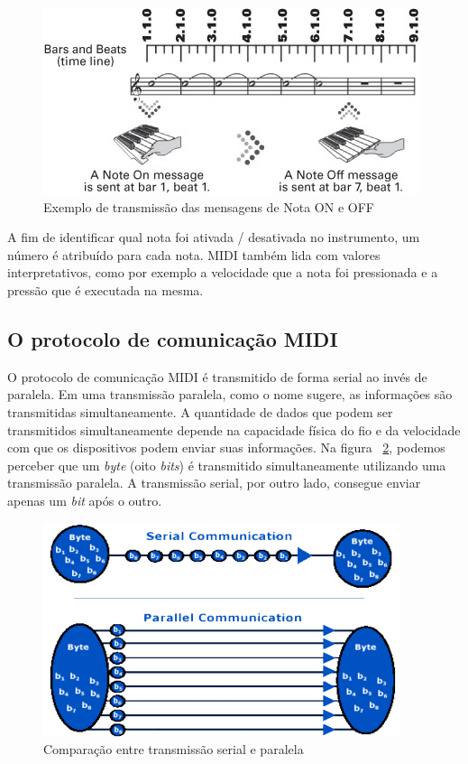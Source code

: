             \begin{figure}[H]
            	\centering
            	\includegraphics{Imagens/MIDI_Nota_ON_e_OFF.jpg}
            	\caption[Exemplo de transmissão das mensagens de Nota ON e OFF]{Exemplo de transmissão das mensagens de Nota ON e OFF ~\cite{Guerin}}
            	\label{fig:MIDI_Nota_ON_e_OFF}
            \end{figure}

            A fim de identificar qual nota foi ativada / desativada no instrumento, um número é atribuído para cada nota. MIDI também lida com valores interpretativos, como por exemplo a velocidade que a nota foi pressionada e a pressão que é executada na mesma.

        \subsection{O protocolo de comunicação MIDI}

            O protocolo de comunicação MIDI é transmitido de forma serial ao invés de paralela. Em uma transmissão paralela, como o nome sugere, as informações são transmitidas simultaneamente. A quantidade de dados que podem ser transmitidos simultaneamente depende na capacidade física do fio e da velocidade com que os dispositivos podem enviar suas informações. Na figura ~\ref{fig:Parallel_versus_serial_transmissions}, podemos perceber que um \textit{byte} (oito \textit{bits}) é transmitido simultaneamente utilizando uma transmissão paralela. A transmissão serial, por outro lado, consegue enviar apenas um \textit{bit} após o outro.

            \begin{figure}[H]
            	\centering
            	\includegraphics[scale=0.8]{Imagens/Parallel_versus_serial_transmissions.png}
            	\caption[Comparação entre transmissão serial e paralela]{Comparação entre transmissão serial e paralela}
            	\label{fig:Parallel_versus_serial_transmissions}
            \end{figure}

